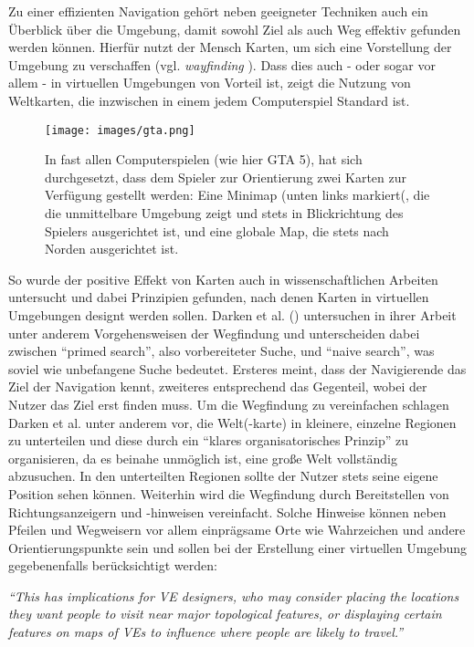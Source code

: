 Zu einer effizienten Navigation gehört neben geeigneter Techniken auch ein Überblick über die Umgebung, damit sowohl Ziel als auch Weg effektiv gefunden werden können.
Hierfür nutzt der Mensch Karten, um sich eine Vorstellung der Umgebung zu verschaffen (vgl. \textit{wayfinding} \cite{Bowman2001AnDesign}). Dass dies auch - oder sogar vor allem - in virtuellen Umgebungen von Vorteil ist, zeigt die Nutzung von Weltkarten, die inzwischen in einem jedem Computerspiel Standard ist. 


\begin{figure}[h]
  \centering
  \texttt{[image: images/gta.png]}
  \caption{In fast allen Computerspielen (wie hier GTA 5), hat sich durchgesetzt, dass dem Spieler zur Orientierung zwei Karten zur Verfügung gestellt werden: Eine Minimap (unten links markiert(, die die unmittelbare Umgebung zeigt und stets in Blickrichtung des Spielers ausgerichtet ist, und eine globale Map, die stets nach Norden ausgerichtet ist.}
  \label{fig:todo}
\end{figure}

So wurde der positive Effekt von Karten auch in wissenschaftlichen Arbeiten untersucht und dabei Prinzipien gefunden, nach denen Karten in virtuellen Umgebungen designt werden sollen.
Darken et al. (\cite{12_Darken1996_WayfindingStrategies}) untersuchen in ihrer Arbeit unter anderem Vorgehensweisen der Wegfindung und unterscheiden dabei zwischen “primed search”, also vorbereiteter Suche, und “naive search”, was soviel wie unbefangene Suche bedeutet.
Ersteres meint, dass der Navigierende das Ziel der Navigation kennt, zweiteres entsprechend das Gegenteil, wobei der Nutzer das Ziel erst finden muss.
Um die Wegfindung zu vereinfachen schlagen Darken et al. unter anderem vor, die Welt(-karte) in kleinere, einzelne Regionen zu unterteilen und diese durch ein “klares organisatorisches Prinzip” zu organisieren, da es beinahe unmöglich ist, eine große Welt vollständig abzusuchen. In den unterteilten Regionen sollte der Nutzer stets seine eigene Position sehen können. 
Weiterhin wird die Wegfindung durch Bereitstellen von Richtungsanzeigern und -hinweisen vereinfacht. Solche Hinweise können neben Pfeilen und Wegweisern vor allem einprägsame Orte wie Wahrzeichen und andere Orientierungspunkte sein und sollen bei der Erstellung einer virtuellen Umgebung gegebenenfalls berücksichtigt werden:

\begin{addmargin}[25pt]{0pt} 

\textit{“This has implications for VE designers, who may consider placing the locations they want
people to visit near major topological features, or displaying certain features on maps of
VEs to influence where people are likely to travel.”} \cite{12_Darken1996_WayfindingStrategies}

\end{addmargin}

